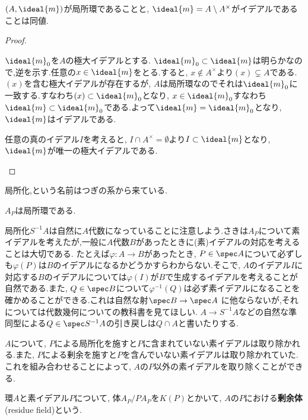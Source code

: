 \begin{prop}\label{prop:local ring equiv}
	$(A,\ideal{m})$が局所環であることと, $\ideal{m}=A\setminus A^\times$がイデアルであることは同値.
\end{prop}

\begin{proof}
	\begin{eqv}
		\item $\ideal{m}_0$を$A$の極大イデアルとする. $\ideal{m}_0\subset\ideal{m}$は明らかなので,逆を示す.任意の$x\in\ideal{m}$をとる.すると, $x\not\in A^\times$より$(x)\subsetneq A$である. $(x)$を含む極大イデアルが存在するが, $A$は局所環なのでそれは$\ideal{m}_0$に一致する.すなわち$(x)\subset\ideal{m}_0$となり, $x\in\ideal{m}_0$すなわち$\ideal{m}\subset\ideal{m}_0$である.よって$\ideal{m}=\ideal{m}_0$となり, $\ideal{m}$はイデアルである.
		\item 任意の真のイデアル$I$を考えると, $I\cap A^\times=\emptyset$より$I\subset\ideal{m}$となり, $\ideal{m}$が唯一の極大イデアルである. 
	\end{eqv}
\end{proof}

局所化,という名前はつぎの系から来ている.
\begin{cor}
	$A_P$は局所環である.
\end{cor}

局所化$S^{-1}A$は自然に$A$代数になっていることに注意しよう.さきは$A_P$について素イデアルを考えたが,一般に$A$代数$B$があったときに(素)イデアルの対応を考えることは大切である. たとえば$\varphi:A\to B$があったとき, $P\in\spec A$について必ずしも$\varphi(P)$は$B$のイデアルになるかどうかすらわからない.そこで, $A$のイデアル$I$に対応する$B$のイデアルについては$\varphi(I)$が$B$で生成するイデアルを考えることが自然である.また, $Q\in\spec B$について$\varphi^{-1}(Q)$は必ず素イデアルになることを確かめることができる.これは自然な射$\spec B\to\spec A$
に他ならないが,それについては代数幾何についての教科書を見てほしい. $A\to S^{-1}A$などの自然な準同型による$Q\in\spec S^{-1}A$の引き戻しは$Q\cap A$と書いたりする.

$A$について, $P$による局所化を施すと$P$に含まれていない素イデアルは取り除かれる.また, $P$による剰余を施すと$P$を含んでいない素イデアルは取り除かれていた.これを組み合わせることによって, $A$の$P$以外の素イデアルを取り除くことができる.
\begin{defi}[剰余体]\label{defi:剰余体}
	環$A$と素イデアル$P$について, 体$A_P/PA_P$を$K(P)$とかいて, $A$の$P$における\textbf{剰余体}(residue field)という.
\end{defi}

